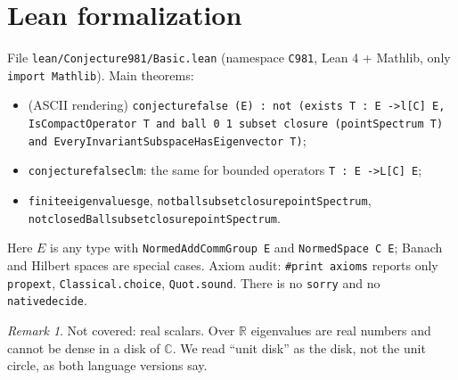 \documentclass[11pt]{article}
\theoremstyle{definition}
\theoremstyle{remark}
\newtheorem{remark}[theorem]{Remark}
\renewcommand{\_}{\oldus\allowbreak}
\begin{document}
\section{Lean formalization}

File \texttt{lean/Conjecture981/Basic.lean} (namespace \texttt{C981}, Lean 4 + Mathlib, only
\texttt{import Mathlib}). Main theorems:
\begin{itemize}
  \item (ASCII rendering) \texttt{conjecture\_false (E) : not (exists T : E ->l[C] E, IsCompactOperator T and
        ball 0 1 subset closure (pointSpectrum T) and EveryInvariantSubspaceHasEigenvector T)};
  \item \texttt{conjecture\_false\_clm}: the same for bounded operators \texttt{T : E ->L[C] E};
  \item \texttt{finite\_eigenvalues\_ge}, \texttt{not\_ball\_subset\_closure\_pointSpectrum},
        \texttt{not\_closedBall\_subset\_closure\_pointSpectrum}.
\end{itemize}
Here $E$ is any type with \texttt{NormedAddCommGroup E} and \texttt{NormedSpace C E}; Banach and Hilbert
spaces are special cases. Axiom audit: \texttt{\#print axioms} reports only \texttt{propext},
\texttt{Classical.choice}, \texttt{Quot.sound}. There is no \texttt{sorry} and no \texttt{native\_decide}.

\begin{remark}
Not covered: real scalars. Over $\mathbb R$ eigenvalues are real numbers and cannot be dense in a disk of
$\mathbb C$. We read ``unit disk'' as the disk, not the unit circle, as both language versions say.
\end{remark}
\end{document}
